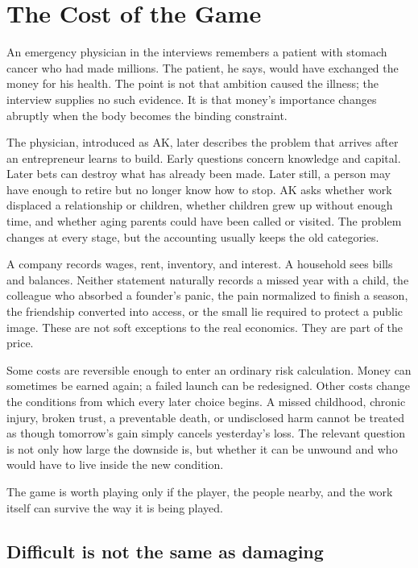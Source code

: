 \chapter{The Cost of the Game}

An emergency physician in the interviews remembers a patient with stomach
cancer who had made millions. The patient, he says, would have exchanged the
money for his health. The point is not that ambition caused the illness; the
interview supplies no such evidence. It is that money's importance changes
abruptly when the body becomes the binding constraint.

The physician, introduced as AK, later describes the problem that arrives
after an entrepreneur learns to build. Early questions concern knowledge and
capital. Later bets can destroy what has already been made. Later still, a
person may have enough to retire but no longer know how to stop. AK asks
whether work displaced a relationship or children, whether children grew up
without enough time, and whether aging parents could have been called or
visited. The problem changes at every stage, but the accounting usually keeps
the old categories.

A company records wages, rent, inventory, and interest. A household sees bills
and balances. Neither statement naturally records a missed year with a child,
the colleague who absorbed a founder's panic, the pain normalized to finish a
season, the friendship converted into access, or the small lie required to
protect a public image. These are not soft exceptions to the real economics.
They are part of the price.

Some costs are reversible enough to enter an ordinary risk calculation. Money
can sometimes be earned again; a failed launch can be redesigned. Other costs
change the conditions from which every later choice begins. A missed
childhood, chronic injury, broken trust, a preventable death, or undisclosed
harm cannot be treated as though tomorrow's gain simply cancels yesterday's
loss. The relevant question is not only how large the downside is, but whether
it can be unwound and who would have to live inside the new condition.

The game is worth playing only if the player, the people nearby, and the work
itself can survive the way it is being played.

\section{Difficult is not the same as damaging}

